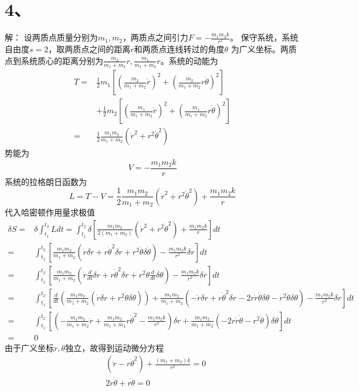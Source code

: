 \documentclass[10pt,a4paper]{article}
\begin{document}
\section*{4、}解：
设两质点质量分别为$m_1,m_2$，两质点之间引力$F=-\frac{m_1m_2k}{r^2}$。 保守系统，系统自由度$s=2$，取两质点之间的距离$r$和两质点连线转过的角度$\theta$ 为广义坐标。两质点到系统质心的距离分别为$\frac{m_2}{m_1+m_2}r,\frac{m_1}{m_1+m_2}r$。系统的动能为
\begin{align*}
T=&\frac{1}{2}m_1[(\frac{m_2}{m_1+m_2}\dot{r})^2+(\frac{m_2}{m_1+m_2}r\dot{\theta})^2]\\
&+\frac{1}{2}m_2[(\frac{m_1}{m_1+m_2}\dot{r})^2+(\frac{m_1}{m_1+m_2}r\dot{\theta})^2]\\
=&\frac{1}{2}\frac{m_1m_2}{m_1+m_2}(\dot{r}^2+r^2\dot{\theta}^2)
\end{align*}
势能为
\[
V=-\frac{m_1m_2k}{r}
\]
系统的拉格朗日函数为
\[
L=T-V=\frac{1}{2}\frac{m_1m_2}{m_1+m_2}(\dot{r}^2+r^2\dot{\theta}^2)+\frac{m_1m_2k}{r}
\]
代入哈密顿作用量求极值
\begin{align*}
\delta S=&\delta\int_{t_1}^{t_2}Ldt=\int_{t_1}^{t_2}\delta[\frac{m_1m_2}{2(m_1+m_2)}(\dot{r}^2+r^2\dot{\theta}^2)+\frac{m_1m_2k}{r}]dt\\
=&\int_{t_1}^{t_2}[\frac{m_1m_2}{m_1+m_2}(\dot{r}\delta\dot{r}+r\dot{\theta}^2\delta r+r^2\dot{\theta}\delta\dot{\theta})-\frac{m_1m_2k}{r^2}\delta r]dt\\
=&\int_{t_1}^{t_2}[\frac{m_1m_2}{m_1+m_2}(\dot{r}\frac{d}{dt}\delta r+r\dot{\theta}^2\delta r+r^2\dot{\theta}\frac{d}{dt}\delta\theta)-\frac{m_1m_2k}{r^2}\delta r]dt\\
=&\int_{t_1}^{t_2}[\frac{d}{dt}(\frac{m_1m_2}{m_1+m_2}(\dot{r}\delta r+r^2\dot{\theta}\delta\theta))+\frac{m_1m_2}{m_1+m_2}(-\ddot{r}\delta r+r\dot{\theta}^2\delta r-2r\dot{r}\dot{\theta}\delta\theta-r^2\ddot{\theta}\delta\theta)-\frac{m_1m_2k}{r^2}\delta r]dt\\
=&\int_{t_1}^{t_2}[(-\frac{m_1m_2}{m_1+m_2}\ddot{r}+\frac{m_1m_2}{m_1+m_2}r\dot{\theta}^2-\frac{m_1m_2k}{r^2})\delta r+\frac{m_1m_2}{m_1+m_2}(-2r\dot{r}\dot{\theta}-r^2\ddot{\theta})\delta\theta]dt\\
=&0
\end{align*}
由于广义坐标$r,\theta$独立，故得到运动微分方程
\begin{align*}
&(\ddot{r}-r\dot{\theta}^2)+\frac{(m_1+m_2)k}{r^2}=0\\
&2\dot{r}\dot{\theta}+r\ddot{\theta}=0
\end{align*}
\end{document}
